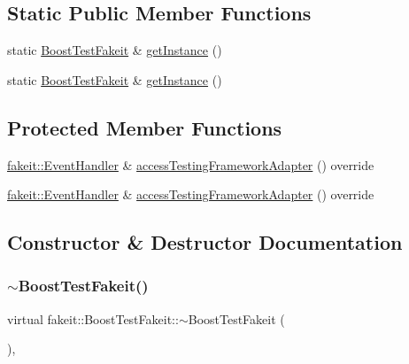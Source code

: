 \subsection*{Static Public Member Functions}
\begin{DoxyCompactItemize}
\item 
static \mbox{\hyperlink{classfakeit_1_1BoostTestFakeit}{Boost\+Test\+Fakeit}} \& \mbox{\hyperlink{classfakeit_1_1BoostTestFakeit_a1c311dab079fc7d816c747a696dd98a8}{get\+Instance}} ()
\item 
static \mbox{\hyperlink{classfakeit_1_1BoostTestFakeit}{Boost\+Test\+Fakeit}} \& \mbox{\hyperlink{classfakeit_1_1BoostTestFakeit_a1c311dab079fc7d816c747a696dd98a8}{get\+Instance}} ()
\end{DoxyCompactItemize}
\subsection*{Protected Member Functions}
\begin{DoxyCompactItemize}
\item 
\mbox{\hyperlink{structfakeit_1_1EventHandler}{fakeit\+::\+Event\+Handler}} \& \mbox{\hyperlink{classfakeit_1_1BoostTestFakeit_aa82090202cc88ef0a3e6ca6c3c8786da}{access\+Testing\+Framework\+Adapter}} () override
\item 
\mbox{\hyperlink{structfakeit_1_1EventHandler}{fakeit\+::\+Event\+Handler}} \& \mbox{\hyperlink{classfakeit_1_1BoostTestFakeit_aa82090202cc88ef0a3e6ca6c3c8786da}{access\+Testing\+Framework\+Adapter}} () override
\end{DoxyCompactItemize}


\subsection{Constructor \& Destructor Documentation}
\mbox{\label{classfakeit_1_1BoostTestFakeit_a5d878b1b242b7edbbf95deced18e9707}} 
\subsubsection{\texorpdfstring{$\sim$BoostTestFakeit()}{~BoostTestFakeit()}\hspace{0.1cm}{\footnotesize\ttfamily [1/2]}}
{\footnotesize\ttfamily virtual fakeit\+::\+Boost\+Test\+Fakeit\+::$\sim$\+Boost\+Test\+Fakeit (\begin{DoxyParamCaption}{ }\end{DoxyParamCaption})\hspace{0.3cm}{\ttfamily [virtual]}, {\ttfamily [default]}}

